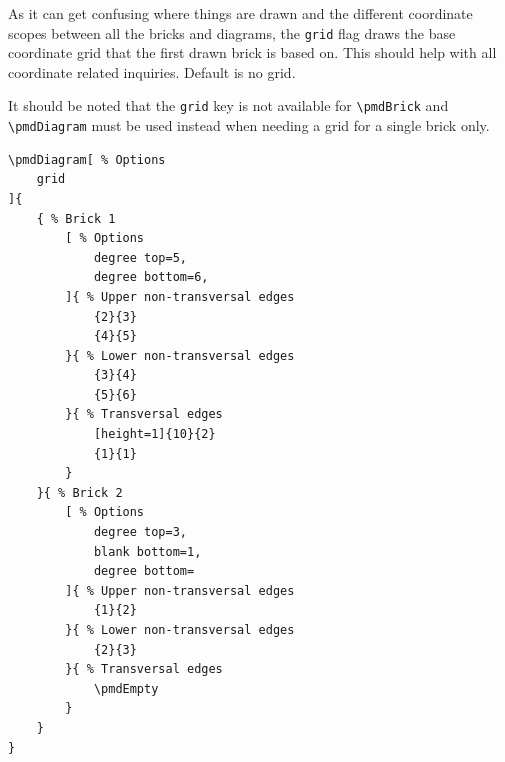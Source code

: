\documentclass{ltxdoc}
\begin{document}
As it can get confusing where things are drawn and the different coordinate scopes between all the bricks and diagrams, the \texttt{grid} flag draws the base coordinate grid that the first drawn brick is based on. This should help with all coordinate related inquiries. Default is no grid.

It should be noted that the \texttt{grid} key is not available for \verb`\pmdBrick` and \verb`\pmdDiagram` must be used instead when needing a grid for a single brick only.
\begin{center}
    \begin{minipage}{\dimexpr0.85\textwidth-2\fboxrule-2\fboxsep\relax}
        \begin{minipage}[c]{0.4\linewidth}
\begin{verbatim}
\pmdDiagram[ % Options
    grid
]{
    { % Brick 1
        [ % Options
            degree top=5,
            degree bottom=6,
        ]{ % Upper non-transversal edges
            {2}{3}
            {4}{5}
        }{ % Lower non-transversal edges
            {3}{4}
            {5}{6}
        }{ % Transversal edges
            [height=1]{10}{2}
            {1}{1}
        }
    }{ % Brick 2
        [ % Options
            degree top=3,
            blank bottom=1,
            degree bottom=
        ]{ % Upper non-transversal edges
            {1}{2}
        }{ % Lower non-transversal edges
            {2}{3}
        }{ % Transversal edges
            \pmdEmpty
        }
    }
}
\end{verbatim}
        \end{minipage}
        \hfill
        \begin{minipage}[c]{0.4\linewidth}
        \end{minipage}
    \end{minipage}%
\end{center}
\begin{center}
\end{center}
\end{document}
